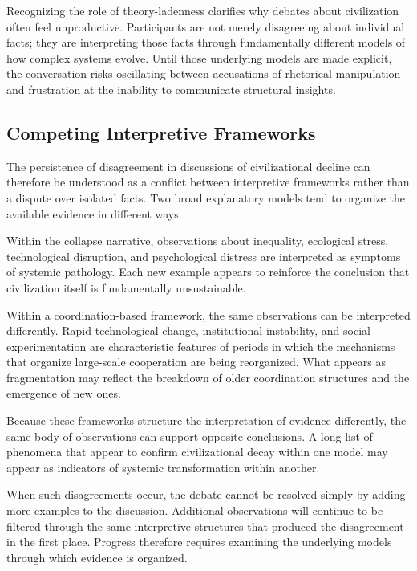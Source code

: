 \documentclass[12pt]{article}
\begin{document}
Recognizing the role of theory-ladenness clarifies why debates about civilization often feel unproductive. Participants are not merely disagreeing about individual facts; they are interpreting those facts through fundamentally different models of how complex systems evolve. Until those underlying models are made explicit, the conversation risks oscillating between accusations of rhetorical manipulation and frustration at the inability to communicate structural insights.

\subsection{Competing Interpretive Frameworks}

The persistence of disagreement in discussions of civilizational decline can therefore be understood as a conflict between interpretive frameworks rather than a dispute over isolated facts. Two broad explanatory models tend to organize the available evidence in different ways.

Within the collapse narrative, observations about inequality, ecological stress, technological disruption, and psychological distress are interpreted as symptoms of systemic pathology. Each new example appears to reinforce the conclusion that civilization itself is fundamentally unsustainable.

Within a coordination-based framework, the same observations can be interpreted differently. Rapid technological change, institutional instability, and social experimentation are characteristic features of periods in which the mechanisms that organize large-scale cooperation are being reorganized. What appears as fragmentation may reflect the breakdown of older coordination structures and the emergence of new ones.

Because these frameworks structure the interpretation of evidence differently, the same body of observations can support opposite conclusions. A long list of phenomena that appear to confirm civilizational decay within one model may appear as indicators of systemic transformation within another.

When such disagreements occur, the debate cannot be resolved simply by adding more examples to the discussion. Additional observations will continue to be filtered through the same interpretive structures that produced the disagreement in the first place. Progress therefore requires examining the underlying models through which evidence is organized.
\end{document}

